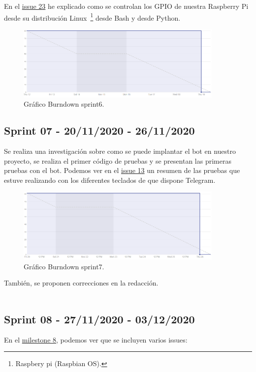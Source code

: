 En el \href{https://github.com/davidelinformatico/TFG/issues/23}{issue 23} he explicado como se controlan los GPIO de nuestra Raspberry Pi desde su distribución Linux~\footnote{Raspbery pi (Raspbian OS).} desde Bash y desde Python.

\begin{figure}[h]
    \centering
    \includegraphics[width=0.9\textwidth]{img/BurnDown/6.PNG}
    \caption{Gráfico Burndown sprint6. } \label{BD6}
\end{figure}

\subsection{Sprint 07 - 20/11/2020 - 26/11/2020}
Se realiza una investigación sobre como se puede implantar el bot en nuestro proyecto, se realiza el primer código de pruebas y se presentan las primeras pruebas con el bot. Podemos ver en el \href{https://github.com/davidelinformatico/TFG/issues/13}{issue 13} un resumen de las pruebas que estuve realizando con los diferentes teclados de que dispone Telegram.
\begin{figure}[h]
    \centering
    \includegraphics[width=0.9\textwidth]{img/BurnDown/7.PNG}
    \caption{Gráfico Burndown sprint7. } \label{BD5}
\end{figure}

También, se proponen correcciones en la redacción.~\\~\\

\subsection{Sprint 08 - 27/11/2020 - 03/12/2020}
En el \href{https://github.com/davidelinformatico/TFG/milestone/8?closed=1}{milestone 8}, podemos ver que se incluyen varios issues:

